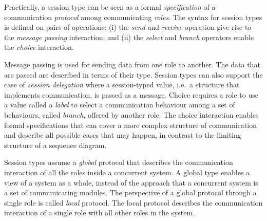
Practically, a session type can be seen as a formal
{\em specification} of a communication {\em protocol} among communicating {\em roles}.
The syntax for session types is defined on pairs of operations:
(i) the {\em send} and {\em receive} operation give rise to
the {\em message passing} interaction; and
(ii) the {\em select} and {\em branch} operators enable the
{\em choice} interaction.

Message passing is used for sending data from one role to another.
The data that are passed are described in terms of their type. Session
types can also support the case of {\em session delegation}
where a session-typed value, i.e.~a structure that implements communication,
is passed as a message.
Choice requires a role to use a value called a {\em label}
to select a communication behaviour among
a set of behaviours, called {\em branch}, offered by another role.
The choice interaction enables formal specifications that can
cover a more complex structure of communication and describe all possible
cases that may happen, in contrast to the limiting structure of
a sequence diagram.

Session types assume a {\em global} protocol that describes the
communication interaction of all the roles inside a concurrent system.
A global type enables a view of a system as a whole, instead of the 
approach that a concurrent system is a set of communicating modules.
The perspective of a global protocol through a single role
is called {\em local} protocol. The local protocol describes
the communication interaction of a single role with all other roles
in the system.

